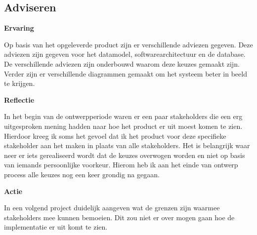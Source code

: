\subsection{Adviseren}

\textbf{Ervaring}

\whitespace
Op basis van het opgeleverde product zijn er verschillende adviezen gegeven.
Deze adviezen zijn gegeven voor het datamodel, softwarearchitectuur en de database.
De verschillende adviezen zijn onderbouwd waarom deze keuzes gemaakt zijn.
Verder zijn er verschillende diagrammen gemaakt om het systeem beter in beeld te krijgen.

\whitespace
\textbf{Reflectie}

\whitespace
In het begin van de ontwerpperiode waren er een paar stakeholders die een erg uitgesproken mening hadden naar hoe het product er uit moest komen te zien.
Hierdoor kreeg ik soms het gevoel dat ik het product voor deze specifieke stakeholder aan het maken in plaats van alle stakeholders.
Het is belangrijk waar neer er iets gerealiseerd wordt dat de keuzes overwogen worden en niet op basis van iemands persoonlijke voorkeur.
Hierom heb ik aan het einde van ontwerp process alle keuzes nog een keer grondig na gegaan.

\whitespace
\textbf{Actie}

\whitespace
In een volgend project duidelijk aangeven wat de grenzen zijn waarmee stakeholders mee kunnen bemoeien.
Dit zou niet er over mogen gaan hoe de implementatie er uit komt te zien.


